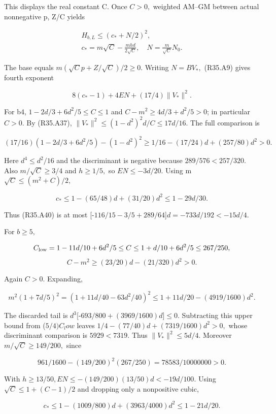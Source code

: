 This displays the real constant C. Once \(C>0,\allowbreak \) weighted AM--GM between actual nonnegative p, Z/C yields

\[
\begin{gathered}
H_{b,L}\le(c_*+N/2)^2,\quad\\
c_*=m\sqrt C-\frac{mhd}{2\sqrt C},\quad N=\frac m{\sqrt C}N_0.
\end{gathered}\tag{R35.A39}
\]

The base equals \(m(\sqrt{C}p+Z/\sqrt{C})/2\ge 0.\) Writing \(N=BV_*,\allowbreak \) (R35.A9) gives fourth exponent

\[
8(c_*-1)+4EN+(17/4)\|V_*\|^2. \tag{R35.A40}
\]

For b4,
\(1-2d/3+6d^2/5\le C\le 1\) and \(C-m^2\ge 4d/3+d^2/5>0\); in particular \(C>0.\)
By (R35.A37), \(\lVert V_*\rVert ^2\le (1-d^2)^2d/C\le 17d/16.\) The full comparison is

\[
(17/16)(1-2d/3+6d^2/5)-(1-d^2)^2
\ge1/16-(17/24)d+(257/80)d^2>0.
\]

Here \(d^4\le d^2/16\) and the discriminant is negative because \(289/576<257/320.\)
Also \(m/\sqrt{C}\ge 3/4\) and \(h\ge 1/5,\allowbreak \) so \(EN\le -3d/20.\)
Using m \(\sqrt{C}\le (m^2+C)/2,\allowbreak \)

\[
c_*\le1-(65/48)d+(31/20)d^2\le1-29d/30.
\]

Thus (R35.A40) is at most
[-\(116/15-3/5+289/64\)]\(d=-733d/192<-15d/4.\)

For \(b\ge 5,\allowbreak \)

\[
C_{\rm low}=1-11d/10+6d^2/5\le C\le1+d/10+6d^2/5\le267/250,
\]
\[
C-m^2\ge(23/20)d-(21/320)d^2>0.
\]

Again \(C>0.\) Expanding,

\[
m^2(1+7d/5)^2=(1+11d/40-63d^2/40)^2
\le1+11d/20-(4919/1600)d^2.
\]

The discarded tail is \(d^3\)[-\(693/800+(3969/1600)d\)]\ensuremath{\le}0. Subtracting this upper bound from (\(5/4)C_low\) leaves
\(1/4-(77/40)d+(7319/1600)d^2>0,\allowbreak \) whose discriminant comparison is \(5929<7319.\)
Thus \(\lVert V_*\rVert ^2\le 5d/4.\) Moreover \(m/\sqrt{C}\ge 149/200,\allowbreak \) since

\[
961/1600-(149/200)^2(267/250)=78583/10000000>0.
\]

With \(h\ge 13/50,\allowbreak  EN\le -(149/200)(13/50)d<-19d/100.\)
Using \(\sqrt{C}\le 1+(C-1)/2\) and dropping only a nonpositive cubic,

\[
c_*\le1-(1009/800)d+(3963/4000)d^2\le1-21d/20.
\]

